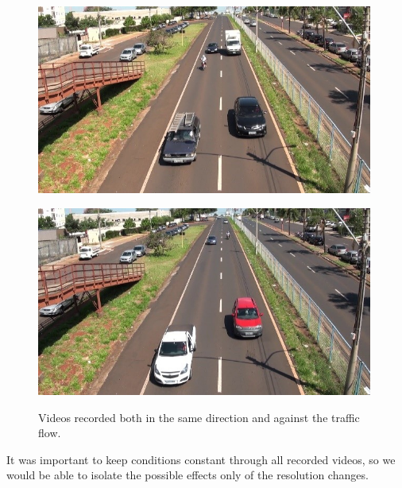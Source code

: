 \documentclass[article,12pt,a4paper,oneside,hidelinks]{memoir}
\begin{document}
\begin{figure}[!htbp]
	\begin{minipage}[t]{0.5\textwidth}
		\centering
		\includegraphics[width=0.985\textwidth]{Figuras/fig3c.jpg}
		\label{fig:sub:subfigure3c}
	\end{minipage}
	\hspace{\fill}
	\begin{minipage}[t]{0.5\textwidth}
		\centering
		\includegraphics[width=0.985\textwidth]{Figuras/fig3d.jpg}
		\label{fig:sub:subfigure3d}
	\end{minipage}
	\caption{Videos recorded both in the same direction and against the traffic flow.}
	\label{fig:fig2}
\end{figure}

It was important to keep conditions constant through all recorded videos, so we would be able to isolate the possible effects only of the resolution changes.
\end{document}
